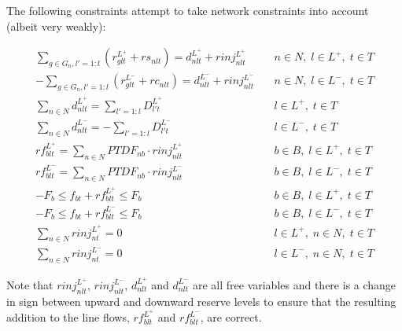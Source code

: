 \documentclass[number,times]{elsarticle}
\begin{document}
The following constraints attempt to take network constraints into account (albeit very weakly):

\begin{align}
    \sum_{g \in G_n, l'=1:l} (r^{L^+}_{glt} + rs_{nlt}) = d^{L^+}_{nlt} + rinj^{L^+}_{nlt}   & \quad n \in N, \; l \in L^+, \; t \in T \label{eq:reserve_network_activation_constraints_1} \\
    - \sum_{g \in G_n, l'=1:l} (r^{L^-}_{glt} + rc_{nlt}) = d^{L^-}_{nlt} + rinj^{L^-}_{nlt} & \quad n \in N, \; l \in L^-, \; t \in T                                                     \\
    \sum_{n \in N} d^{L^+}_{nlt} = \sum_{l'=1:l} D^{L^+}_{l't}                               & \quad l \in L^+, \; t \in T                                                                 \\
    \sum_{n \in N} d^{L^-}_{nlt} = - \sum_{l'=1:l} D^{L^-}_{l't}                             & \quad l \in L^-, \; t \in T                                                                 \\
    rf^{L^+}_{blt} = \sum_{n \in N} PTDF_{nb} \cdot rinj^{L^+}_{nlt}                         & \quad b \in B, \; l \in L^+, \; t \in T                                                     \\
    rf^{L^-}_{blt} = \sum_{n \in N} PTDF_{nb} \cdot rinj^{L^-}_{nlt}                         & \quad b \in B, \; l \in L^-, \; t \in T                                                     \\
    -F_{b} \leq f_{bt} + rf^{L^+}_{blt} \leq F_b                                             & \quad b \in B, \; l \in L^+, \; t \in T                                                     \\
    -F_{b} \leq f_{bt} + rf^{L^-}_{blt} \leq F_b                                             & \quad b \in B, \; l \in L^-, \; t \in T                                                     \\
    \sum_{n \in N} rinj^{L^+}_{nt} = 0                                                       & \quad l \in L^+, \; n \in N, \; t \in T                                                     \\
    \sum_{n \in N} rinj^{L^-}_{nt} = 0                                                       & \quad l \in L^-, \; n \in N, \; t \in T \label{eq:reserve_network_activation_constraints_2}
\end{align}

Note that $rinj^{L^+}_{nlt}$, $rinj^{L^-}_{nlt}$, $d^{L^+}_{nlt}$ and $d^{L^-}_{nlt}$ are all free variables and there is a change in sign between upward and downward reserve levels to ensure that the resulting addition to the line flows, $rf^{L^+}_{blt}$ and $rf^{L^-}_{blt}$, are correct.
\end{document}
